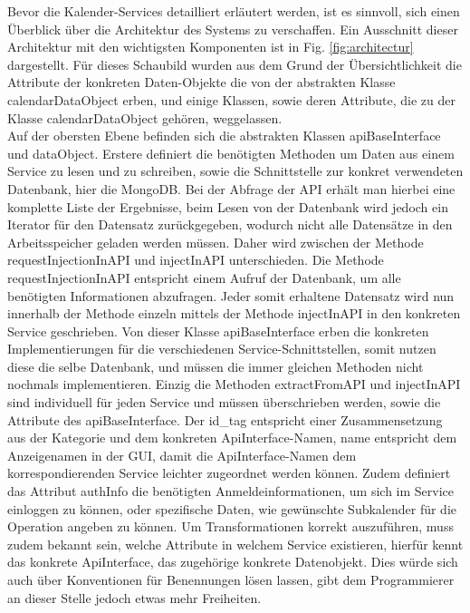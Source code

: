 Bevor die Kalender-Services detailliert erläutert werden, ist es sinnvoll, sich einen Überblick über die Architektur des Systems zu verschaffen. Ein Ausschnitt dieser Architektur mit den wichtigsten Komponenten ist in Fig. \ref{fig:architectur} dargestellt. Für dieses Schaubild wurden aus dem Grund der Übersichtlichkeit die Attribute der konkreten Daten-Objekte die von der abstrakten Klasse calendarDataObject erben, und einige Klassen, sowie deren Attribute, die zu der Klasse calendarDataObject gehören, weggelassen.\\
Auf der obersten Ebene befinden sich die abstrakten Klassen apiBaseInterface und dataObject. Erstere definiert die benötigten Methoden um Daten aus einem Service zu lesen und zu schreiben, sowie die Schnittstelle zur konkret verwendeten Datenbank, hier die MongoDB. Bei der Abfrage der API erhält man hierbei eine komplette Liste der Ergebnisse, beim Lesen von der Datenbank wird jedoch ein Iterator für den Datensatz zurückgegeben, wodurch nicht alle Datensätze in den Arbeitsspeicher geladen werden müssen. Daher wird zwischen der Methode requestInjectionInAPI und injectInAPI unterschieden. Die Methode requestInjectionInAPI entspricht einem Aufruf der Datenbank, um alle benötigten Informationen abzufragen. Jeder somit erhaltene Datensatz wird nun innerhalb der Methode einzeln mittels der Methode injectInAPI in den konkreten Service geschrieben. Von dieser Klasse apiBaseInterface erben die konkreten Implementierungen für die verschiedenen Service-Schnittstellen, somit nutzen diese die selbe Datenbank, und müssen die immer gleichen Methoden nicht nochmals implementieren. Einzig die Methoden extractFromAPI und injectInAPI sind individuell für jeden Service und müssen überschrieben werden, sowie die Attribute des apiBaseInterface. Der id\_tag entspricht einer Zusammensetzung aus der Kategorie und dem konkreten ApiInterface-Namen, name entspricht dem Anzeigenamen in der GUI, damit die ApiInterface-Namen dem korrespondierenden Service leichter zugeordnet werden können. Zudem definiert das Attribut authInfo die benötigten Anmeldeinformationen, um sich im Service einloggen zu können, oder spezifische Daten, wie gewünschte Subkalender für die Operation angeben zu können. Um Transformationen korrekt auszuführen, muss zudem bekannt sein, welche Attribute in welchem Service existieren, hierfür kennt das konkrete ApiInterface, das zugehörige konkrete Datenobjekt. Dies würde sich auch über Konventionen für Benennungen lösen lassen, gibt dem Programmierer an dieser Stelle jedoch etwas mehr Freiheiten. \\

